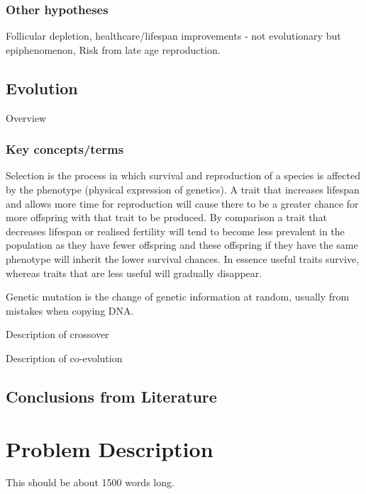 \documentclass[authoryearcitations]{UoYCSproject}
\begin{document}
\subsection{Other hypotheses}
Follicular depletion, healthcare/lifespan improvements - not evolutionary but epiphenomenon, Risk from late age reproduction.

\newpage
\section{Evolution}
Overview \cite{origin1859}

\subsection{Key concepts/terms}
\begin{description}[style=nextline]
\item[Selection] Selection is the process in which survival and reproduction of a species is affected by the phenotype (physical expression of genetics). A trait that increases lifespan and allows more time for reproduction will cause there to be a greater chance for more offspring with that trait to be produced. By comparison a trait that decreases lifespan or realised fertility will tend to become less prevalent in the population as they have fewer offspring and these offspring if they have the same phenotype will inherit the lower survival chances. In essence useful traits survive, whereas traits that are less useful will gradually disappear.

\item [Mutation] Genetic mutation is the change of genetic information at random, usually from mistakes when copying DNA. 

\item [Crossover] Description of crossover

\item [Coevolution] Description of co-evolution
\end{description}

\section{Conclusions from Literature}


\chapter{Problem Description}
\label{cha:Problem Description}
This should be about 1500 words long.
\end{document}
